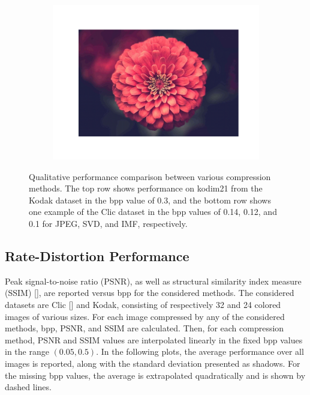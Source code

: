 \begin{figure}[t]
\begin{subfigure}{.23\textwidth}
	\end{subfigure}
    \begin{subfigure}{.23\textwidth}
		\centering
		\includegraphics[trim=1.7cm 1cm 1.7cm 1.7cm, clip, width=1\textwidth]{figures/clic_flower_IMF - YCbCr_bpp_0.108.pdf}
	\end{subfigure}

    \caption{Qualitative performance comparison between various compression methods. The top row shows performance on kodim21 from the Kodak dataset in the bpp value of 0.3, and the bottom row shows one example of the Clic dataset in the bpp values of 0.14, 0.12, and 0.1 for JPEG, SVD, and IMF, respectively. }
	\label{fig:qualitative_comparison}
\end{figure}



\subsection{Rate-Distortion Performance} \label{sec:rate_distortion_performance}
Peak signal-to-noise ratio (PSNR), as well as structural similarity index measure (SSIM) [], are reported versus bpp for the considered methods. 
The considered datasets are Clic [] and Kodak, consisting of respectively 32 and 24 colored images of various sizes.
For each image compressed by any of the considered methods, bpp, PSNR, and SSIM are calculated. 
Then, for each compression method, PSNR and SSIM values are interpolated linearly in the fixed bpp values in the range $(0.05, 0.5)$. 
In the following plots, the average performance over all images is reported, along with the standard deviation presented as shadows.
For the missing bpp values, the average is extrapolated quadratically and is shown by dashed lines.

